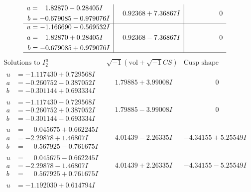 \documentclass[1p]{elsarticle_modified}
\theoremstyle{definition}
\newcommand{\I}{\sqrt{-1}}
\begin{document}
$$\begin{array}{c|c|c}
\begin{aligned}
a &= \phantom{-}1.82870 - 0.28405 I \\
b &= -0.679085 - 0.979076 I\end{aligned}
 & \phantom{-}0.92368 + 7.36867 I & \phantom{-0.000000 } 0 \\ \hline\begin{aligned}
u &= -1.166690 - 0.569532 I \\
a &= \phantom{-}1.82870 + 0.28405 I \\
b &= -0.679085 + 0.979076 I\end{aligned}
 & \phantom{-}0.92368 - 7.36867 I & \phantom{-0.000000 } 0\\
 \hline 
 \end{array}$$\newpage$$\begin{array}{c|c|c}  
\text{Solutions to }I^u_{2}& \I (\text{vol} + \sqrt{-1}CS) & \text{Cusp shape}\\
 \hline 
\begin{aligned}
u &= -1.117430 + 0.729568 I \\
a &= -0.260752 - 0.387052 I \\
b &= -0.301144 + 0.693334 I\end{aligned}
 & \phantom{-}1.79885 + 3.99008 I & \phantom{-0.000000 } 0 \\ \hline\begin{aligned}
u &= -1.117430 - 0.729568 I \\
a &= -0.260752 + 0.387052 I \\
b &= -0.301144 - 0.693334 I\end{aligned}
 & \phantom{-}1.79885 - 3.99008 I & \phantom{-0.000000 } 0 \\ \hline\begin{aligned}
u &= \phantom{-}0.045675 + 0.662245 I \\
a &= -2.29878 + 1.46807 I \\
b &= \phantom{-}0.567925 - 0.761675 I\end{aligned}
 & \phantom{-}4.01439 - 2.26335 I & -4.34155 + 5.25549 I \\ \hline\begin{aligned}
u &= \phantom{-}0.045675 - 0.662245 I \\
a &= -2.29878 - 1.46807 I \\
b &= \phantom{-}0.567925 + 0.761675 I\end{aligned}
 & \phantom{-}4.01439 + 2.26335 I & -4.34155 - 5.25549 I \\ \hline\begin{aligned}
u &= -1.192030 + 0.614794 I \\

\end{aligned}
\end{array}$$
\end{document}
